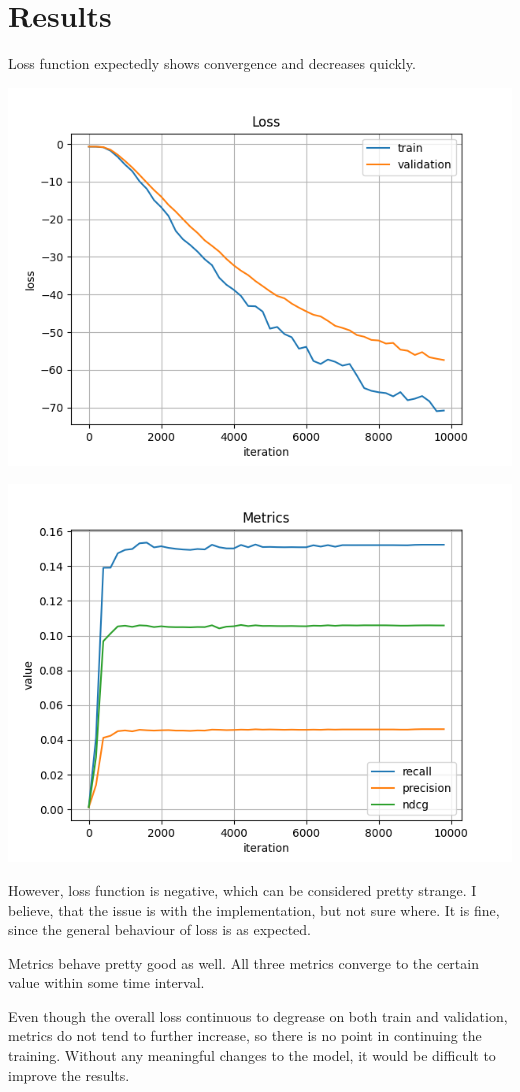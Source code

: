 \section{Results}
Loss function expectedly shows convergence and decreases quickly.
\begin{minipage}{\linewidth}
    \centering%
    \includegraphics[scale=0.35]{assets/loss.png}%
    \label{fig:res:loss}%

    \includegraphics[scale=0.35]{assets/metrics.png}%
    \label{fig:res:metrics}%

\end{minipage}

However, loss function is negative, which can be considered pretty strange. I
believe, that the issue is with the implementation, but not sure where. It is
fine, since the general behaviour of loss is as expected.

Metrics behave pretty good as well. All three metrics converge to the certain
value within some time interval.

Even though the overall loss continuous to degrease on both train and
validation, metrics do not tend to further increase, so there is no point in
continuing the training. Without any meaningful changes to the model, it would
be difficult to improve the results.